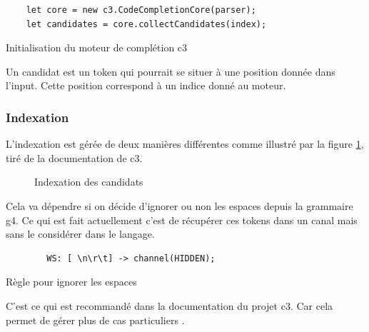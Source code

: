 \documentclass[
    iict, %
    il, %
]{heig-tb}
\begin{document}
\begin{listing}[!ht]
    \begin{verbatim}
    let core = new c3.CodeCompletionCore(parser);
    let candidates = core.collectCandidates(index);
    \end{verbatim}
    \caption{Initialisation du moteur de complétion c3}
    \label{c3-setup}
\end{listing}

Un candidat est un token qui pourrait se situer à une position donnée dans l'input.
Cette position correspond à un indice donné au moteur.

\subsubsection{Indexation}
L'indexation est gérée de deux manières différentes comme illustré par la figure \ref{candidat-index}, tiré de la documentation de c3.

\begin{figure}[!h]
    \begin{center}
    \end{center}
    \caption[Indexation des candidats]{\label{candidat-index} Indexation des candidats}
\end{figure}

Cela va dépendre si on décide d'ignorer ou non les espaces depuis la grammaire g4.
Ce qui est fait actuellement c'est de récupérer ces tokens dans un canal mais sans le considérer dans le langage.

\begin{listing}[H]
    \begin{verbatim}
        WS: [ \n\r\t] -> channel(HIDDEN);
    \end{verbatim}
    \caption{Règle pour ignorer les espaces}
    \label{space-rule}
\end{listing}

C'est ce qui est recommandé dans la documentation du projet c3. Car cela permet de gérer plus de cas particuliers \cite{c3-example-soql}.
\end{document}
